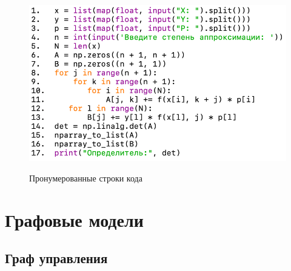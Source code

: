 \documentclass[12pt]{report}
\begin{document}
	\begin{figure}[H]
		\centering	
		{\includegraphics[scale=1.3]{img/code.png}}
		\caption{Пронумерованные строки кода}
		\label{ris:image_code}
	\end{figure}

	\chapter{Графовые модели}
	
	\section{Граф управления}
	
\end{document}
